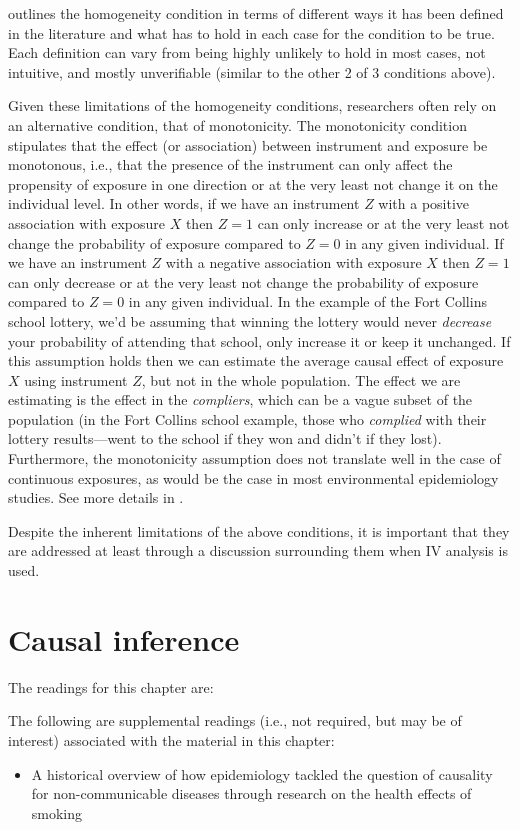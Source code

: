 \documentclass[
]{book}
\providecommand{\tightlist}{%
  \setlength{\itemsep}{0pt}\setlength{\parskip}{0pt}}
\begin{document}
\citet{hernanch16} outlines the homogeneity condition in terms of different ways it has been defined in the literature and what has to hold in each case for the condition to be true. Each definition can vary from being highly unlikely to hold in most cases, not intuitive, and mostly unverifiable (similar to the other 2 of 3 conditions above).

Given these limitations of the homogeneity conditions, researchers often rely on an alternative condition, that of monotonicity. The monotonicity condition stipulates that the effect (or association) between instrument and exposure be monotonous, i.e., that the presence of the instrument can only affect the propensity of exposure in one direction or at the very least not change it on the individual level. In other words, if we have an instrument \(Z\) with a positive association with exposure \(X\) then \(Z=1\) can only increase or at the very least not change the probability of exposure compared to \(Z=0\) in any given individual. If we have an instrument \(Z\) with a negative association with exposure \(X\) then \(Z=1\) can only decrease or at the very least not change the probability of exposure compared to \(Z=0\) in any given individual. In the example of the Fort Collins school lottery, we'd be assuming that winning the lottery would never \emph{decrease} your probability of attending that school, only increase it or keep it unchanged. If this assumption holds then we can estimate the average causal effect of exposure \(X\) using instrument \(Z\), but not in the whole population. The effect we are estimating is the effect in the \emph{compliers}, which can be a vague subset of the population (in the Fort Collins school example, those who \emph{complied} with their lottery results---went to the school if they won and didn't if they lost). Furthermore, the monotonicity assumption does not translate well in the case of continuous exposures, as would be the case in most environmental epidemiology studies. See more details in \citet{hernanch16}.

Despite the inherent limitations of the above conditions, it is important that they are addressed at least through a discussion surrounding them when IV analysis is used.

\hypertarget{causal-inference}{%
\chapter{Causal inference}\label{causal-inference}}

The readings for this chapter are:

The following are supplemental readings (i.e., not required, but may be of
interest) associated with the material in this chapter:

\begin{itemize}
\tightlist
\item
  \citet{samet2016epidemiology} A historical overview of how epidemiology tackled the question of causality for non-communicable diseases through research on the health effects of smoking
\end{itemize}

  
\end{document}
